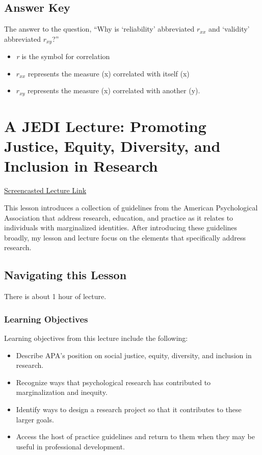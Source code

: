 \documentclass[
  english,
]{book}
\providecommand{\tightlist}{%
  \setlength{\itemsep}{0pt}\setlength{\parskip}{0pt}}
\begin{document}
\hypertarget{answer-key-1}{%
\section{Answer Key}\label{answer-key-1}}

The answer to the question, ``Why is `reliability' abbreviated \(r_{xx}\) and `validity' abbreviated \(r_{xy}\)?''

\begin{itemize}
\tightlist
\item
  \emph{r} is the symbol for correlation
\item
  \(r_{xx}\) represents the measure (x) correlated with itself (x)
\item
  \(r_{xy}\) represents the measure (x) correlated with another (y).
\end{itemize}

\hypertarget{JEDI}{%
\chapter{A JEDI Lecture: Promoting Justice, Equity, Diversity, and Inclusion in Research}\label{JEDI}}

\href{https://spu.hosted.panopto.com/Panopto/Pages/Viewer.aspx?pid=4539c65f-aceb-42ce-80ad-ac71001fc36a}{Screencasted Lecture Link}

This lesson introduces a collection of guidelines from the American Psychological Association that address research, education, and practice as it relates to individuals with marginalized identities. After introducing these guidelines broadly, my lesson and lecture focus on the elements that specifically address research.

\hypertarget{navigating-this-lesson-6}{%
\section{Navigating this Lesson}\label{navigating-this-lesson-6}}

There is about 1 hour of lecture.

\hypertarget{learning-objectives-6}{%
\subsection{Learning Objectives}\label{learning-objectives-6}}

Learning objectives from this lecture include the following:

\begin{itemize}
\tightlist
\item
  Describe APA's position on social justice, equity, diversity, and inclusion in research.
\item
  Recognize ways that psychological research has contributed to marginalization and inequity.
\item
  Identify ways to design a research project so that it contributes to these larger goals.
\item
  Access the host of practice guidelines and return to them when they may be useful in professional development.
\end{itemize}
\end{document}
